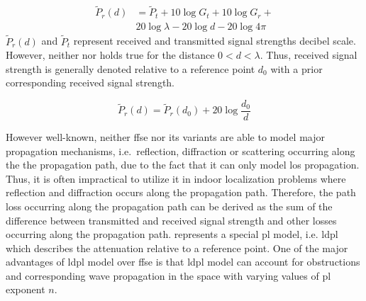     \begin{equation}
      \begin{split}
        \label{eq:friisdBm}
        \widetilde{P}_r(d) &= \widetilde{P}_t + 10 \log{G_t} + 10 \log{G_r} + \\
        & 20 \log{\lambda} - 20 \log{d} - 20 \log{4 \pi}
      \end{split}
    \end{equation}
    $\widetilde{P}_r(d)$ and $\widetilde{P}_t$ represent received and transmitted signal strengths decibel scale.
    However, neither  nor  holds true for the distance $0<d<\lambda$.
    Thus, received signal strength is generally denoted relative to a reference point $d_0$ with a prior corresponding received signal strength.

    \begin{equation}
        \label{eq:friisRef}
        \widetilde{P}_r(d) = \widetilde{P}_r(d_0) + 20 \log{\dfrac{d_0}{d}}
    \end{equation}


    However well-known, neither \gls{ffse} nor its variants are able to model major propagation mechanisms, i.e.\ reflection, diffraction or scattering occurring along the the propagation path, due to the fact that it can only model \gls{los} propagation.
    Thus, it is often impractical to utilize it in indoor localization problems where reflection and diffraction occurs along the propagation path.
    Therefore, the path loss occurring along the propagation path can be derived as the sum of the difference between transmitted and received signal strength and other losses occurring along the propagation path.
     represents a special \gls{pl} model, i.e. \gls{ldpl} which describes the attenuation relative to a reference point.
    One of the major advantages of \gls{ldpl} model over \gls{ffse} is that \gls{ldpl} model can account for obstructions and corresponding wave propagation in the space with varying values of \gls{pl} exponent $n$.


